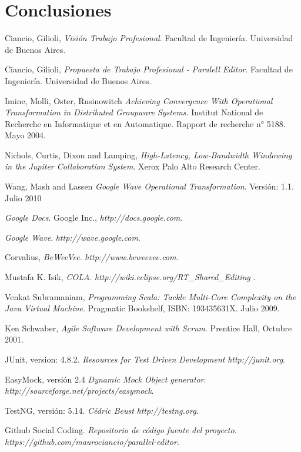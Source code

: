 \documentclass[12pt,a4paper]{article}
\begin{document}
\section{Conclusiones}

\newpage
\begin{thebibliography}{9}
	Ciancio, Gilioli,
	\emph{Visión Trabajo Profesional}.
	Facultad de Ingeniería.
	Universidad de Buenos Aires. 

	Ciancio, Gilioli,
	\emph{Propuesta de Trabajo Profesional - Paralell Editor}.
	Facultad de Ingeniería.
	Universidad de Buenos Aires. 

	Imine, Molli, Oster, Rusinowitch
	\emph{Achieving Convergence With Operational Transformation in Distributed Groupware Systems}.
	Institut National de Recherche en Informatique et en Automatique.
	Rapport de recherche n° 5188. 
	Mayo 2004.

	Nichols, Curtis, Dixon and Lamping,
	\emph{High-Latency, Low-Bandwidth Windowing in the Jupiter Collaboration System}.
	Xerox Palo Alto Research Center.

	Wang, Mash and Lassen
	\emph{Google Wave Operational Transformation}.
	Versión: 1.1.
	Julio 2010
	
	\emph{Google Docs}. 
	Google Inc., 
	\textsl{http://docs.google.com}.
	
	\emph{Google Wave}. 
	\textsl{http://wave.google.com}.

	Corvalius,
	\emph{BeWeeVee}. 
	\textsl{http://www.beweevee.com}.
	
	Mustafa K. Isik,
	\emph{COLA}. 
	\textsl{ http://wiki.eclipse.org/RT\_Shared\_Editing }.

	Venkat Subramaniam,
	\emph{Programming Scala: Tackle Multi-Core Complexity on the Java Virtual Machine}.
	Pragmatic Bookshelf, ISBN: 193435631X.
	Julio 2009.

	Ken Schwaber,
	\emph{Agile Software Development with Scrum}.
	Prentice Hall, 
	Octubre 2001.

	JUnit, version: 4.8.2.
	\emph{Resources for Test Driven Development} 
	\textsl{http://junit.org}.

	EasyMock, versión 2.4
	\emph{Dynamic Mock Object generator}. \\
	\textsl{http://sourceforge.net/projects/easymock}.

	TestNG, versión: 5.14.
	\emph{Cédric Beust} 
	\textsl{http://testng.org}.

	Github Social Coding.
	\emph{Repositorio de código fuente del proyecto.} 
	\textsl{https://github.com/maurociancio/parallel-editor}.

		
\end{thebibliography}
\end{document}
